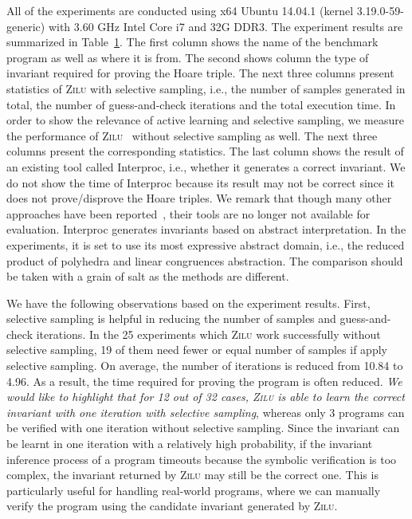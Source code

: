 \begin{table}[t]
\begin{tabular}{l c | c c c | c c c | c }
\hline
\end{tabular}
\label{tbl:stats}
\end{table}

All of the experiments are conducted using x64 Ubuntu 14.04.1 (kernel 3.19.0-59-generic) with 3.60 GHz Intel Core i7 and 32G DDR3. The experiment results are summarized in Table~\ref{tbl:stats}. The first column shows the name of the benchmark program as well as where it is from. The second shows column the type of invariant required for proving the Hoare triple. The next three columns present statistics of \textsc{Zilu} with selective sampling, i.e., the number of samples generated in total, the number of guess-and-check iterations and the total execution time. In order to show the relevance of active learning and selective sampling, we measure the performance of \textsc{Zilu}~\cite{zilu:repo} without selective sampling as well. The next three columns present the corresponding statistics. The last column shows the result of an existing tool called Interproc, i.e., whether it generates a correct invariant. We do not show the time of Interproc because its result may not be correct since it does not prove/disprove the Hoare triples. We remark that though many other approaches have been reported~\cite{sharma2012interpolants,sharma2013verification,DBLP:conf/esop/0001GHALN13,sharma2014invariant}, their tools are no longer not available for evaluation. Interproc generates invariants based on abstract interpretation. In the experiments, it is set to use its most expressive abstract domain, i.e., the reduced product of polyhedra and linear congruences abstraction. The comparison should be taken with a grain of salt as the methods are different.

We have the following observations based on the experiment results. First, selective sampling is helpful in reducing the number of samples and guess-and-check iterations. In the 25 experiments which \textsc{Zilu} work successfully without selective sampling, 19 of them need fewer or equal number of samples if apply selective sampling. On average, the number of iterations is reduced from 10.84 to 4.96. As a result, the time required for proving the program is often reduced.
\emph{We would like to highlight that for 12 out of 32 cases, \textsc{Zilu} is able to learn the correct invariant with one iteration with selective sampling}, whereas only 3 programs can be verified with one iteration without selective sampling. Since the invariant can be learnt in one iteration with a relatively high probability, if the invariant inference process of a program timeouts because the symbolic verification is too complex,
the invariant returned by \textsc{Zilu} may still be the correct one.
This is particularly useful for handling real-world programs,
where we can manually verify the program using the candidate invariant generated by \textsc{Zilu}.


